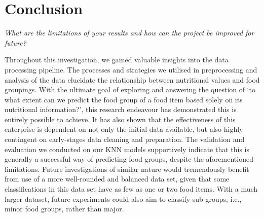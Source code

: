 \documentclass[11pt]{article}
\begin{document}
\section{Conclusion}
\emph{What are the limitations of your results and how can the project be improved for future?}

Throughout this investigation, we gained valuable insights into the data processing pipeline. The processes and strategies we utilised in preprocessing and analysis of the data elucidate the relationship between nutritional values and food groupings. With the ultimate goal of exploring and answering the question of ‘to what extent can we predict the food group of a food item based solely on its nutritional information?’,  this research endeavour has demonstrated this is entirely possible to achieve. It has also shown that the effectiveness of this enterprise is dependent on not only the initial data available, but also highly contingent on early-stages data cleaning and preparation. The validation and evaluation we conducted on our KNN models supportively indicate that this is generally a successful way of predicting food groups, despite the aforementioned limitations. Future investigations of similar nature would tremendously benefit from use of a more well-rounded and balanced data set, given that some classifications in this data set have as few as one or two food items. With a much larger dataset, future experiments could also aim to classify sub-groups, i.e., minor food groups, rather than major.


\newpage


\end{document}
